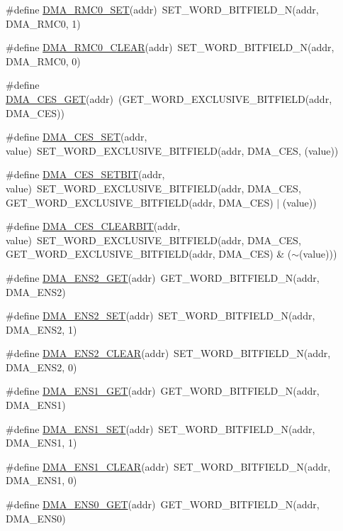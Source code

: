 \begin{DoxyCompactItemize}
\item 
\#define \hyperlink{a00548_ad92ae525a798d1227a947e4c26534154}{DMA\_\-RMC0\_\-SET}(addr)~SET\_\-WORD\_\-BITFIELD\_\-N(addr, DMA\_\-RMC0, 1)
\item 
\#define \hyperlink{a00548_a6955922a392f4112276c59daaa5453b6}{DMA\_\-RMC0\_\-CLEAR}(addr)~SET\_\-WORD\_\-BITFIELD\_\-N(addr, DMA\_\-RMC0, 0)
\item 
\#define \hyperlink{a00548_a424d59ef61a3b99f116138df706f6a62}{DMA\_\-CES\_\-GET}(addr)~(GET\_\-WORD\_\-EXCLUSIVE\_\-BITFIELD(addr, DMA\_\-CES))
\item 
\#define \hyperlink{a00548_a4dcfbea0b74402793c20596add2d7fce}{DMA\_\-CES\_\-SET}(addr, value)~SET\_\-WORD\_\-EXCLUSIVE\_\-BITFIELD(addr, DMA\_\-CES, (value))
\item 
\#define \hyperlink{a00548_a57edd45383f1e44efa579b9167aecb7f}{DMA\_\-CES\_\-SETBIT}(addr, value)~SET\_\-WORD\_\-EXCLUSIVE\_\-BITFIELD(addr, DMA\_\-CES, GET\_\-WORD\_\-EXCLUSIVE\_\-BITFIELD(addr, DMA\_\-CES) $|$ (value))
\item 
\#define \hyperlink{a00548_a5f4dfe1e49bc70afe3c317bc1f5c0ffc}{DMA\_\-CES\_\-CLEARBIT}(addr, value)~SET\_\-WORD\_\-EXCLUSIVE\_\-BITFIELD(addr, DMA\_\-CES, GET\_\-WORD\_\-EXCLUSIVE\_\-BITFIELD(addr, DMA\_\-CES) \& ($\sim$(value)))
\item 
\#define \hyperlink{a00548_a38882dccbd2e7802c29e37ac3de3a168}{DMA\_\-ENS2\_\-GET}(addr)~GET\_\-WORD\_\-BITFIELD\_\-N(addr, DMA\_\-ENS2)
\item 
\#define \hyperlink{a00548_a0282b9ae556284ebf1c06bd12effc453}{DMA\_\-ENS2\_\-SET}(addr)~SET\_\-WORD\_\-BITFIELD\_\-N(addr, DMA\_\-ENS2, 1)
\item 
\#define \hyperlink{a00548_ac9866b36e3744a82d5f8342f88da2e2d}{DMA\_\-ENS2\_\-CLEAR}(addr)~SET\_\-WORD\_\-BITFIELD\_\-N(addr, DMA\_\-ENS2, 0)
\item 
\#define \hyperlink{a00548_a5cf74b54c9041035ef4f26e02d0683ee}{DMA\_\-ENS1\_\-GET}(addr)~GET\_\-WORD\_\-BITFIELD\_\-N(addr, DMA\_\-ENS1)
\item 
\#define \hyperlink{a00548_a1cadacbe67cd725331c88a0dfc0c1746}{DMA\_\-ENS1\_\-SET}(addr)~SET\_\-WORD\_\-BITFIELD\_\-N(addr, DMA\_\-ENS1, 1)
\item 
\#define \hyperlink{a00548_a005c10da097b9d409cdf8ceb3d2f5afe}{DMA\_\-ENS1\_\-CLEAR}(addr)~SET\_\-WORD\_\-BITFIELD\_\-N(addr, DMA\_\-ENS1, 0)
\item 
\#define \hyperlink{a00548_a9a9f65fc6921c6b20f6112ee01863235}{DMA\_\-ENS0\_\-GET}(addr)~GET\_\-WORD\_\-BITFIELD\_\-N(addr, DMA\_\-ENS0)

\end{DoxyCompactItemize}
